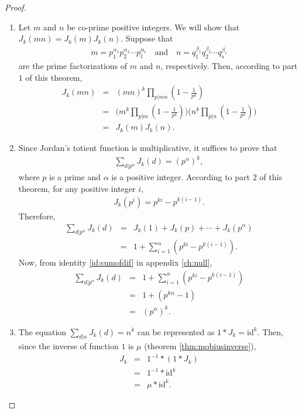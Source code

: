 \documentclass[12pt]{subfile}
\begin{document}
\begin{proof}
\begin{enumerate}
				\item Let $m$ and $n$ be co-prime positive integers. We will show that $J_k(mn)=J_k(m)J_k(n)$. Suppose that
					\begin{align*}
						m = p_1^{\alpha_1}p_2^{\alpha_2} \cdots p_t^{\alpha_t} \quad \text{and} \quad n = q_1^{\beta_1}q_2^{\beta_2} \cdots q_s^{\beta_s}
					\end{align*}
				are the prime factorizations of  $m$ and $n$, respectively. Then, according to part $1$ of this theorem,
					\begin{eqnarray*}
						J_k(mn) &=& (mn)^{k} \prod\limits_{p|mn} \left(1 - \frac{1}{p^k}\right)\\
								&=& \Bigg(m^k \prod\limits_{p|m} \left(1 - \frac{1}{p^k}\right)\Bigg) \Bigg(n^k \prod\limits_{p|n} \left(1 - \frac{1}{p^k}\right)\Bigg) \\
								&=& J_k(m)J_k(n).
					\end{eqnarray*}

				\item Since Jordan's totient function is multiplicative, it suffices to prove that
					\begin{align*}
						\sum\limits_{d|p^\alpha} J_k(d) = (p^{\alpha})^k,
					\end{align*}
				where $p$ is a prime and $\alpha$ is a positive integer. According to part $2$ of this theorem, for any positive integer $i$,
					\begin{align*}
						J_k(p^i) = p^{ki} - p^{k (i -1)}.
					\end{align*}
				Therefore,
					\begin{eqnarray*}
						\sum_{d|p^\alpha} J_k(d) &=& J_k(1) + J_k(p) + \cdots + J_k(p^\alpha)\\
											 &=& 1 + \sum_{i = 1}^{\alpha} \left(p^{ki} - p^{k (i -1)}\right).
					\end{eqnarray*}
				Now, from identity \ref{id:sumofdif} in appendix \ref{ch:null},
					\begin{eqnarray*}
						\sum_{d|p^\alpha} J_k(d) &=& 1 + \sum_{i = 1}^{\alpha} \left(p^{ki} - p^{k (i -1)}\right)\\
											 &=& 1 + \left(p^{k \alpha}-1\right)\\
											 &=& (p^{\alpha})^k.
					\end{eqnarray*}

				\item The equation $\displaystyle \sum_{d|n} J_k(d) = n^k$ can be represented as $1 \ast J_k = \text{id}^k$. Then, since the inverse of function $1$ is $\mu$ (theorem \ref{thm:mobiusinverse}),
					\begin{eqnarray*}
						J_k &=& 1^{-1} \ast (1 \ast J_k)\\
							&=& 1^{-1} \ast \text{id}^k\\
							&=& \mu \ast \text{id}^k.
					\end{eqnarray*}


\end{enumerate}
\end{proof}
\end{document}
